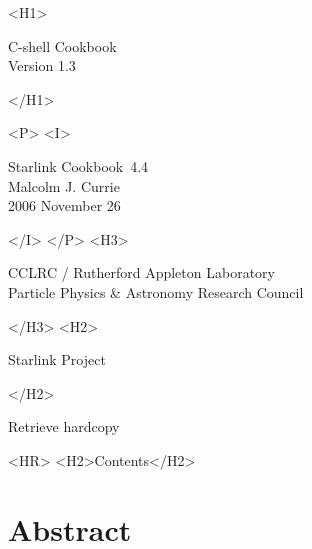 \documentclass[twoside,11pt]{article}
\newcommand{\stardoccategory}  {Starlink Cookbook}
\newcommand{\stardocsource}    {sc4.4}
\newcommand{\stardocnumber}    {4.4}
\newcommand{\stardocauthors}   {Malcolm J. Currie}
\newcommand{\stardocdate}      {2006 November 26}
\newcommand{\stardoctitle}     {C-shell Cookbook}
\newcommand{\stardocversion}   {Version 1.3}
\newcommand{\stardocmanual}    {}
\newcommand{\htmladdnormallink}[2]{#1}
\newcommand{\htmladdimg}[1]{}
\newcommand{\htmlref}[2]{#1}
\newcommand{\htmladdtonavigation}[1]{}
\newcommand{\xlabel}[1]{}
\begin{document}
\begin{htmlonly}
   \xlabel{}
   \begin{rawhtml} <H1> \end{rawhtml}
      \stardoctitle\\
      \stardocversion\\
      \stardocmanual
   \begin{rawhtml} </H1> \end{rawhtml}


   \begin{rawhtml} <P> <I> \end{rawhtml}
   \stardoccategory\ \stardocnumber \\
   \stardocauthors \\
   \stardocdate
   \begin{rawhtml} </I> </P> <H3> \end{rawhtml}
      \htmladdnormallink{CCLRC}{http://www.cclrc.ac.uk} /
      \htmladdnormallink{Rutherford Appleton Laboratory}
                        {http://www.cclrc.ac.uk/ral} \\
      \htmladdnormallink{Particle Physics \& Astronomy Research Council}
                        {http://www.pparc.ac.uk} \\
   \begin{rawhtml} </H3> <H2> \end{rawhtml}
      \htmladdnormallink{Starlink Project}{http://star-www.rl.ac.uk/}
   \begin{rawhtml} </H2> \end{rawhtml}
   \htmladdnormallink{\htmladdimg{source.gif} Retrieve hardcopy}
      {http://star-www.rl.ac.uk/cgi-bin/hcserver?\stardocsource}\\

  \label{stardoccontents}
  \begin{rawhtml} 
    <HR>
    <H2>Contents</H2>
  \end{rawhtml}
  \htmladdtonavigation{\htmlref{\htmladdimg{contents_motif.gif}}
        {stardoccontents}}

  \section{\xlabel{abstract}Abstract}
\end{htmlonly}
\end{document}
